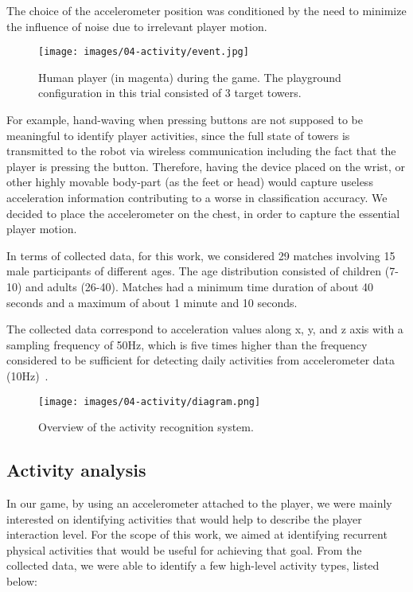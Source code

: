 The choice of the accelerometer position was conditioned by the need to minimize the influence of noise due to irrelevant player motion.

\begin{figure}[thpb]
      \centering
      {\texttt{[image: images/04-activity/event.jpg]}}
      \caption{Human player (in magenta) during the game. The playground configuration in this trial consisted of 3 target towers.}
      \label{game}
\end{figure}

For example, hand-waving when pressing buttons are not supposed to be meaningful to identify player activities, since the full state of towers is transmitted to the robot via wireless communication including the fact that the player is pressing the button. Therefore, having the device placed on the wrist, or other highly movable body-part (as the feet or head) would capture useless acceleration information contributing to a worse in classification accuracy. We decided to place the accelerometer on the chest, in order to capture the essential player motion.

In terms of collected data, for this work, we considered 29 matches involving 15 male participants of different ages. The age distribution consisted of children (7-10) and adults (26-40). Matches had a minimum time duration of about 40 seconds and a maximum of about 1 minute and 10 seconds. 

The collected data correspond to acceleration values along x, y, and z axis with a sampling frequency of 50Hz, which is five times higher than the frequency considered to be sufficient for detecting daily activities from accelerometer data (10Hz)~\citep{atallah_sensor_2010, ravi_activity_2005, kikhia_analyzing_2014}.

\begin{figure*}[!t]
\normalsize
      \centering
      {\texttt{[image: images/04-activity/diagram.png]}}
      \caption{Overview of the activity recognition system.}
      \label{approach}
\end{figure*}
  
\subsection{Activity analysis}\label{sec:activity_analysis}

In our game, by using an accelerometer attached to the player, we were mainly interested on identifying activities that would help to describe the player interaction level. For the scope of this work, we aimed at identifying recurrent physical activities that would be useful for achieving that goal. From the collected data, we were able to identify a few high-level activity types, listed below:

